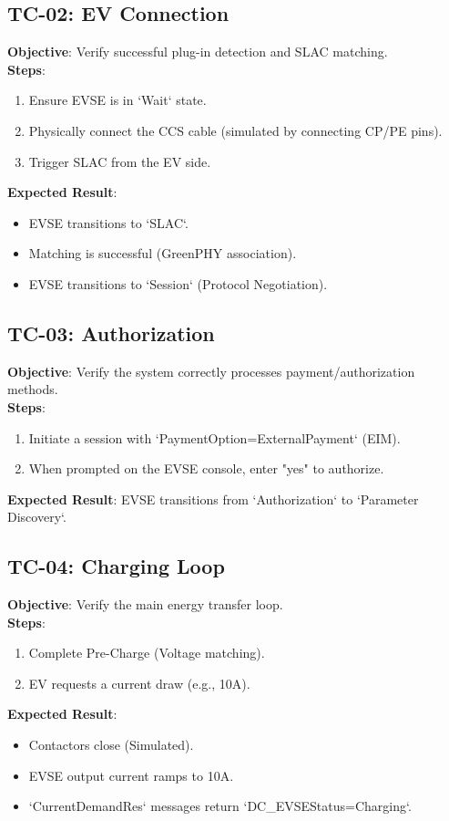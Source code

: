 \documentclass[a4paper,11pt]{report}
\begin{document}
\subsection{TC-02: EV Connection}
\textbf{Objective}: Verify successful plug-in detection and SLAC matching. \\
\textbf{Steps}:
\begin{enumerate}
    \item Ensure EVSE is in `Wait` state.
    \item Physically connect the CCS cable (simulated by connecting CP/PE pins).
    \item Trigger SLAC from the EV side.
\end{enumerate}
\textbf{Expected Result}:
\begin{itemize}
    \item EVSE transitions to `SLAC`.
    \item Matching is successful (GreenPHY association).
    \item EVSE transitions to `Session` (Protocol Negotiation).
\end{itemize}

\subsection{TC-03: Authorization}
\textbf{Objective}: Verify the system correctly processes payment/authorization methods. \\
\textbf{Steps}:
\begin{enumerate}
    \item Initiate a session with `PaymentOption=ExternalPayment` (EIM).
    \item When prompted on the EVSE console, enter "yes" to authorize.
\end{enumerate}
\textbf{Expected Result}: EVSE transitions from `Authorization` to `Parameter Discovery`.

\subsection{TC-04: Charging Loop}
\textbf{Objective}: Verify the main energy transfer loop. \\
\textbf{Steps}:
\begin{enumerate}
    \item Complete Pre-Charge (Voltage matching).
    \item EV requests a current draw (e.g., 10A).
\end{enumerate}
\textbf{Expected Result}:
\begin{itemize}
    \item Contactors close (Simulated).
    \item EVSE output current ramps to 10A.
    \item `CurrentDemandRes` messages return `DC\_EVSEStatus=Charging`.
\end{itemize}
\end{document}
